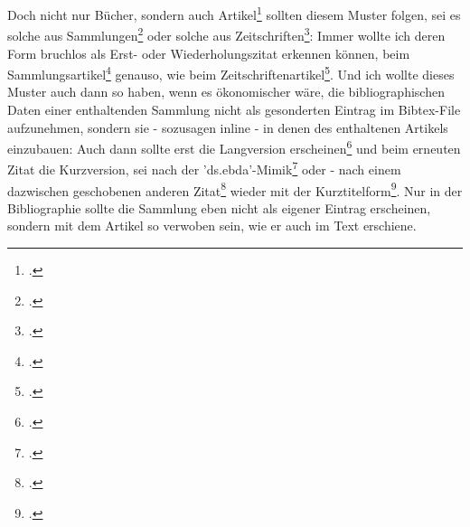 Doch nicht nur Bücher, sondern auch Artikel\footcite[vgl. z.B.][]{Hays1985a}
sollten diesem Muster folgen, sei es solche aus Sammlungen\footcite[s.
etwa][]{Brachman1985a} oder solche aus Zeitschriften\footcite[s.
etwa][]{McCarthy1980a}: Immer wollte ich deren Form bruchlos als Erst- oder
Wiederholungszitat erkennen können, beim Sammlungsartikel\footcite[vgl.
erneut][]{Hays1985a} genauso, wie beim Zeitschriftenartikel\footcite[s.
nochmals][]{McCarthy1980a}. Und ich wollte dieses Muster auch dann so haben,
wenn es ökonomischer wäre, die bibliographischen Daten einer enthaltenden
Sammlung nicht als gesonderten Eintrag im Bibtex-File aufzunehmen, sondern sie -
sozusagen inline - in denen des enthaltenen Artikels einzubauen: Auch dann
sollte erst die Langversion erscheinen\footcite[vgl.][23]{RotCum2011a} und beim
erneuten Zitat die Kurzversion, sei nach der
'ds.ebda'-Mimik\footcite[vgl.][23]{RotCum2011a} oder - nach einem dazwischen
geschobenen anderen Zitat\footcite[vgl.][9]{KantKdU1974} wieder mit der
Kurztitelform\footcite[vgl.][23]{RotCum2011a}. Nur in der Bibliographie sollte
die Sammlung eben nicht als eigener Eintrag erscheinen, sondern mit dem Artikel
so verwoben sein, wie er auch im Text erschiene.

%
